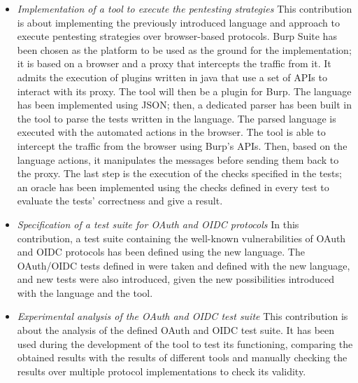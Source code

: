 \begin{itemize}
    \item \textit{Implementation of a tool to execute the pentesting strategies} This contribution is about implementing the previously introduced language and approach to execute pentesting strategies over browser-based protocols. Burp Suite has been chosen as the platform to be used as the ground for the implementation; it is based on a browser and a proxy that intercepts the traffic from it. It admits the execution of plugins written in java that use a set of APIs to interact with its proxy. The tool will then be a plugin for Burp. The language has been implemented using JSON; then, a dedicated parser has been built in the tool to parse the tests written in the language. The parsed language is executed with the automated actions in the browser. The tool is able to intercept the traffic from the browser using Burp's APIs. Then, based on the language actions, it manipulates the messages before sending them back to the proxy. The last step is the execution of the checks specified in the tests; an oracle has been implemented using the checks defined in every test to evaluate the tests' correctness and give a result.
    \item \textit{Specification of a test suite for OAuth and OIDC protocols} In this contribution, a test suite containing the well-known vulnerabilities of OAuth and OIDC protocols has been defined using the new language. The OAuth/OIDC tests defined in \cite{claudio_grisenti, wendy_barreto} were taken and defined with the new language, and new tests were also introduced, given the new possibilities introduced with the language and the tool.
    \item \textit{Experimental analysis of the OAuth and OIDC test suite} This contribution is about the analysis of the defined OAuth and OIDC test suite. It has been used during the development of the tool to test its functioning, comparing the obtained results with the results of different tools and manually checking the results over multiple protocol implementations to check its validity.
\end{itemize}

